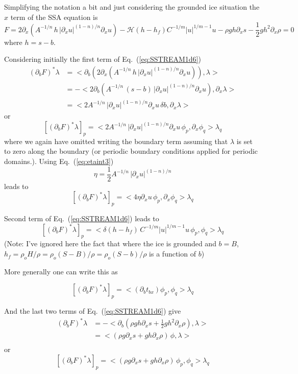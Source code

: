 \documentclass[10pt,a4paper]{book}
\newcommand{\He}{\mathcal{H}}
\newcommand{\p}{\partial}
\newcommand{\tbx}{t_{bx}}
\begin{document}
Simplifying the notation a bit and just considering the grounded ice situation the $x$ term of the SSA equation is 
\begin{equation}
F=2 \p_x \left ( A^{-1/n} \, h \,  | \p_x u|^{(1-n)/n}   \p_x u   \right ) - \He(h-h_f) C^{-1/m} |u|^{1/m-1 } u - \rho g h \p_x s - \frac{1}{2} g h^2 \p_x \rho =0
\label{eq:SSTREAM1d6}
\end{equation}
where $h=s-b$.

Considering initially the first term of Eq.~(\ref{eq:SSTREAM1d6})
\begin{align*}
  (\p_b F )^\ast  \lambda & = <\p_b  \left ( 2 \p_x ( A^{-1/n} \, h \, | \p_x u|^{(1-n)/n}   \p_x u ) \right ) , \lambda>\\
                             & = - <  2 \p_b \left ( A^{-1/n} \, (s-b) \, | \p_x u|^{(1-n)/n}   \p_x u \right ) , \p_x \lambda>\\
  & = < 2  A^{-1/n} \, | \p_x u|^{(1-n)/n}   \p_x u \, \delta b, \p_x \lambda>
\end{align*}
or
\[
  [(\p_b F )^\ast  \lambda ]_p =  <  2  A^{-1/n} \, | \p_x u|^{(1-n)/n}   \p_x u \, \phi_p, \p_x \phi_q> \lambda_q
\]
where we again have omitted writing the boundary term assuming that
$\lambda$ is set to zero along the boundary (or periodic boundary
conditions applied for periodic domains.). Using Eq.~(\ref{eq:etaint3}) 
\[
\eta= \frac{1}{2} A^{-1/n} \, |\p_{x} u|^{(1-n)/n}
\]
leads to
\[
  [(\p_b F )^\ast  \lambda ]_p =  <  4 \eta  \p_x u \, \phi_p, \p_x \phi_q> \lambda_q
\]



Second term of Eq.~(\ref{eq:SSTREAM1d6}) leads to
\[
  [(\p_b F )^\ast  \lambda]_p =   < \delta(h-h_f)   \, C^{-1/m} |u|^{1/m-1} u \, \phi_p, \phi_q > \lambda_q
\]
(Note: I've ignored here the fact that where the ice is grounded and
$b=B$, $h_f=\rho_o H /\rho=\rho_o (S-B) /\rho =\rho_o (S-b) /\rho$ is
a function of $b$)


More generally one can write this as

\[
    [(\p_b F )^\ast  \lambda]_p =   < (\p_b \tbx)  \phi_p, \phi_q > \lambda_q
\]



And the last two terms of Eq.~(\ref{eq:SSTREAM1d6}) give
\begin{align*}
  (\p_b F )^\ast  \lambda & =   - < \p_b \left (\rho g h \p_x s + \frac{1}{2} g h^2 \p_x \rho \right ), \lambda >  \\
                         & =    < (\rho g  \p_x s + g h \p_x \rho ) \, \phi, \lambda >  \\
\end{align*}
or
\[
[ (\p_b F )^\ast  \lambda]_p  =      < (\rho g  \p_x s + g h \p_x \rho ) \, \phi_p , \phi_q >  \lambda_q
\]
\end{document}
